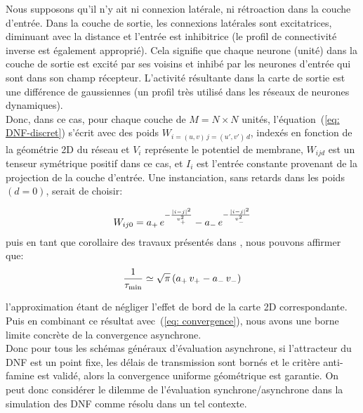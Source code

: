Nous supposons qu'il n'y ait ni connexion latérale, ni rétroaction dans la couche d'entrée. Dans la couche de sortie, les connexions latérales sont excitatrices, diminuant avec la distance et l'entrée est inhibitrice (le profil de connectivité inverse est également approprié). Cela signifie que chaque neurone (unité) dans la couche de sortie est excité par ses voisins et inhibé par les neurones d'entrée qui sont dans son champ récepteur. L'activité résultante dans la carte de sortie est une différence de gaussiennes (un profil très utilisé dans les réseaux de neurones dynamiques).\\

Donc, dans ce cas, pour chaque couche de $M = N \times N $ unités, l'équation~(\ref {eq: DNF-discret}) s'écrit avec des poids $W_{i = (u, v) \, j = (u ', v') \, d}$, indexés en fonction de la géométrie 2D du réseau et $ V_ {i} $ représente le potentiel de membrane, $ W_{ijd} $ est un tenseur symétrique positif dans ce cas, et $ I_ {i} $ est l'entrée constante provenant de la projection de la couche d'entrée. Une instanciation, sans retards dans les poids $(d=0)$, serait de choisir:

\begin{align}
W_{ij0} = a_+ \, e^{-\frac{|i - j|^2}{v_+^2}} -  a_- \, e^{-\frac{|i - j|^2}{v_-^2}} \notag
\end{align}
puis en tant que corollaire des travaux présentés dans \cite{Alexandre:2009}, nous pouvons affirmer que:
\begin{align}
\frac{1}{\tau_{\min}} \simeq \sqrt{\pi} \, (a_+ \, v_+ - a_- \, v_-) \notag
\end{align}

l'approximation étant de négliger l'effet de bord de la carte 2D correspondante. Puis en combinant ce résultat avec~(\ref {eq: convergence}), nous avons une borne limite concrète de la convergence asynchrone.\\

Donc pour tous les schémas généraux d'évaluation asynchrone, si l'attracteur du DNF est un point fixe, les délais de transmission sont bornés et le critère anti-famine est validé, alors la convergence uniforme géométrique est garantie. On peut donc considérer le dilemme de l'évaluation synchrone/asynchrone dans la simulation des DNF comme résolu dans un tel contexte.\\




